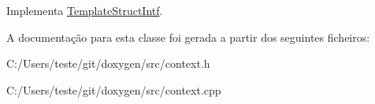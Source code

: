 Implementa \hyperlink{class_template_struct_intf_a49a65a897ba5e4cd6cb80d681c843aab}{Template\-Struct\-Intf}.



A documentação para esta classe foi gerada a partir dos seguintes ficheiros\-:\begin{DoxyCompactItemize}
\item 
C\-:/\-Users/teste/git/doxygen/src/context.\-h\item 
C\-:/\-Users/teste/git/doxygen/src/context.\-cpp\end{DoxyCompactItemize}
